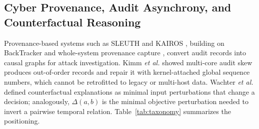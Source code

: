 \documentclass{ieeeaccess}
\begin{document}
\subsection{Cyber Provenance, Audit Asynchrony, and Counterfactual Reasoning}
Provenance-based systems such as SLEUTH \cite{Hossain2017} and KAIROS \cite{Cheng2024}, building on BackTracker \cite{King2003} and whole-system provenance capture \cite{Pasquier2017}, convert audit records into causal graphs for attack investigation. Kimm \emph{et al.} \cite{Kimm2026} showed multi-core audit skew produces out-of-order records and repair it with kernel-attached global sequence numbers, which cannot be retrofitted to legacy or multi-host data. Wachter \emph{et al.} \cite{Wachter2018} defined counterfactual explanations as minimal input perturbations that change a decision; analogously, $\Delta(a,b)$ is the minimal objective perturbation needed to invert a pairwise temporal relation. Table~\ref{tab:taxonomy} summarizes the positioning.
\end{document}
